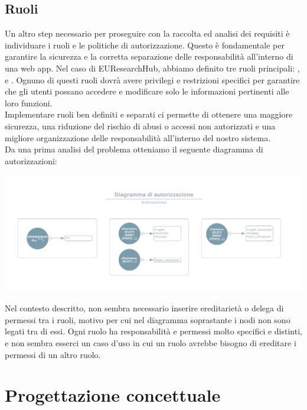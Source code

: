\documentclass{report}
\begin{document}
\subsection{Ruoli}
Un altro step necessario per proseguire con la raccolta ed analisi dei requisiti è individuare i ruoli e le politiche di autorizzazione. Questo è fondamentale per garantire la sicurezza e la corretta separazione delle responsabilità all'interno di una web app. Nel caso di EUResearchHub, abbiamo definito tre ruoli principali: ,  e . Ognuno di questi ruoli dovrà avere privilegi e restrizioni specifici per garantire che gli utenti possano accedere e modificare solo le informazioni pertinenti alle loro funzioni.\\
Implementare ruoli ben definiti e separati ci permette di ottenere una maggiore sicurezza, una riduzione del rischio di abusi o accessi non autorizzati e una migliore organizzazione delle responsabilità all'interno del nostro sistema. \\
Da una prima analisi del problema otteniamo il seguente diagramma di autorizzazioni:
\begin{center}
\includegraphics[scale = 0.7]{1.pdf}
\end{center}
Nel contesto descritto, non sembra necessario inserire ereditarietà o delega di permessi tra i ruoli, motivo per cui nel diagramma soprastante i nodi non sono legati tra di essi. Ogni ruolo ha responsabilità e permessi molto specifici e distinti, e non sembra esserci un caso d'uso in cui un ruolo avrebbe bisogno di ereditare i permessi di un altro ruolo.\\


\section{Progettazione concettuale}
\end{document}
